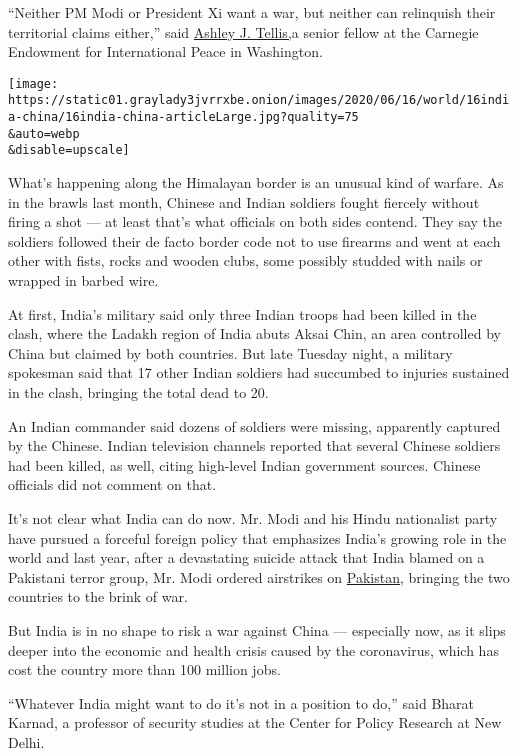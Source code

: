``Neither PM Modi or President Xi want a war, but neither can relinquish
their territorial claims either,'' said
\href{https://carnegieendowment.org/experts/198}{Ashley J. Tellis,}a
senior fellow at the Carnegie Endowment for International Peace in
Washington.

\texttt{[image: https://static01.graylady3jvrrxbe.onion/images/2020/06/16/world/16india-china/16india-china-articleLarge.jpg?quality=75\\\&auto=webp\\\&disable=upscale]}

What's happening along the Himalayan border is an unusual kind of
warfare. As in the brawls last month, Chinese and Indian soldiers fought
fiercely without firing a shot --- at least that's what officials on
both sides contend. They say the soldiers followed their de facto border
code not to use firearms and went at each other with fists, rocks and
wooden clubs, some possibly studded with nails or wrapped in barbed
wire.

At first, India's military said only three Indian troops had been killed
in the clash, where the Ladakh region of India abuts Aksai Chin, an area
controlled by China but claimed by both countries. But late Tuesday
night, a military spokesman said that 17 other Indian soldiers had
succumbed to injuries sustained in the clash, bringing the total dead to
20.

An Indian commander said dozens of soldiers were missing, apparently
captured by the Chinese. Indian television channels reported that
several Chinese soldiers had been killed, as well, citing high-level
Indian government sources. Chinese officials did not comment on that.

It's not clear what India can do now. Mr. Modi and his Hindu nationalist
party have pursued a forceful foreign policy that emphasizes India's
growing role in the world and last year, after a devastating suicide
attack that India blamed on a Pakistani terror group, Mr. Modi ordered
airstrikes on
\href{https://www.nytimes3xbfgragh.onion/2020/06/29/world/asia/pakistan-stock-exchange-shooting.html}{Pakistan},
bringing the two countries to the brink of war.

But India is in no shape to risk a war against China --- especially now,
as it slips deeper into the economic and health crisis caused by the
coronavirus, which has cost the country more than 100 million jobs.

``Whatever India might want to do it's not in a position to do,'' said
Bharat Karnad, a professor of security studies at the Center for Policy
Research at New Delhi.

